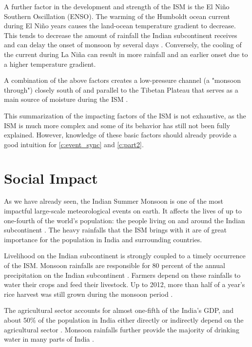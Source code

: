 A further factor in the development and strength of the ISM is the El Niño Southern Oscillation (ENSO). The warming of the Humboldt ocean current during El Niño years causes the land-ocean temperature gradient to decrease. This tends to decrease the amount of rainfall the Indian subcontinent receives and can delay the onset of monsoon by several days \citep{Pradhan.2017, Willetts.2017}. Conversely, the cooling of the current during La Niña can result in more rainfall and an earlier onset due to a higher temperature gradient.

A combination of the above factors creates a low-pressure channel (a "monsoon through") closely south of and parallel to the Tibetan Plateau that serves as a main source of moisture during the ISM \citep{Stolbova.2015}.

This summarization of the impacting factors of the ISM is not exhaustive, as the ISM is much more complex and some of its behavior has still not been fully explained. However, knowledge of these basic factors should already provide a good intuition for \cref{c:event_sync} and \cref{c:part2}.

\section{Social Impact}
\label{st:ism_impact}
As we have already seen, the Indian Summer Monsoon is one of the most impactful large-scale meteorological events on earth. It affects the lives of up to one-fourth of the world's population: the people living on and around the Indian subcontinent \citep{Stolbova.2015}. The heavy rainfalls that the ISM brings with it are of great importance for the population in India and surrounding countries.

Livelihood on the Indian subcontinent is strongly coupled to a timely occurrence of the ISM. Monsoon rainfalls are responsible for 80 percent of the annual precipitation on the Indian subcontinent \citep{Jin.2017}. Farmers depend on these rainfalls to water their crops and feed their livestock. Up to 2012, more than half of a year's rice harvest was still grown during the monsoon period \citep{Auffhammer.2012}.

The agricultural sector accounts for almost one-fifth of the India's GDP, and about 50\% of the population in India either directly or indirectly depend on the agricultural sector \cite{.05.01.2018}. Monsoon rainfalls further provide the majority of drinking water in many parts of India \citep{Stolbova.2015}.

